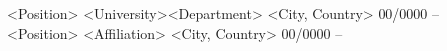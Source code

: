 \begin{cvhonors}
	\cvhonor
	{<Position>}
	{<University>\enskip\cdotp\enskip <Department>}
	{<City, Country>}
	{00/0000 --}
	\cvhonor
	{<Position>}
	{<Affiliation>}
	{<City, Country>}
	{00/0000 --}
\end{cvhonors}